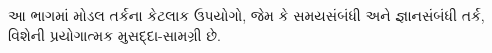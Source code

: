 \documentclass[../../include/open-logic-part]{subfiles}
\begin{document}

\begin{editorial}
આ ભાગમાં મોડલ તર્કના કેટલાક ઉપયોગો, જેમ કે સમયસંબંધી અને
જ્ઞાનસંબંધી તર્ક, વિશેની પ્રયોગાત્મક મુસદ્દા-સામગ્રી છે.
\end{editorial}



\OLEndPartHook
\end{document}
